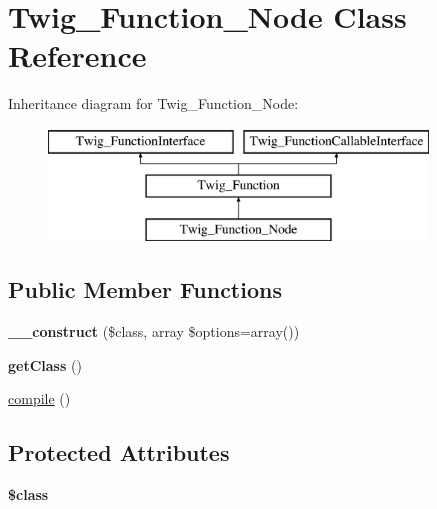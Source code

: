 \hypertarget{classTwig__Function__Node}{}\section{Twig\+\_\+\+Function\+\_\+\+Node Class Reference}
\label{classTwig__Function__Node}
Inheritance diagram for Twig\+\_\+\+Function\+\_\+\+Node\+:\begin{figure}[H]
\begin{center}
\leavevmode
\includegraphics[height=3.000000cm]{classTwig__Function__Node}
\end{center}
\end{figure}
\subsection*{Public Member Functions}
\begin{DoxyCompactItemize}
\item 
{\bfseries \+\_\+\+\_\+construct} (\$class, array \$options=array())\hypertarget{classTwig__Function__Node_a139a7a6c48ca64bfc97fb53ae76d72a4}{}\label{classTwig__Function__Node_a139a7a6c48ca64bfc97fb53ae76d72a4}

\item 
{\bfseries get\+Class} ()\hypertarget{classTwig__Function__Node_abbfb520937a0f7fee9c7fcabaab0fce4}{}\label{classTwig__Function__Node_abbfb520937a0f7fee9c7fcabaab0fce4}

\item 
\hyperlink{classTwig__Function__Node_a2c79e9945bf84b46349bca244fc4538f}{compile} ()
\end{DoxyCompactItemize}
\subsection*{Protected Attributes}
\begin{DoxyCompactItemize}
\item 
{\bfseries \$class}\hypertarget{classTwig__Function__Node_a441f0e88d60bb0a4f45b0b94cffa4357}{}\label{classTwig__Function__Node_a441f0e88d60bb0a4f45b0b94cffa4357}

\end{DoxyCompactItemize}


